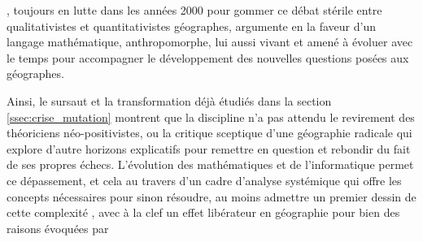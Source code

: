 
\textcite{Sheppard2001}, toujours en lutte dans les années 2000 pour gommer ce débat stérile entre qualitativistes et quantitativistes géographes, argumente en la faveur d'un langage mathématique, anthropomorphe, lui aussi vivant et amené à évoluer avec le temps pour accompagner le développement des nouvelles questions posées aux géographes.


Ainsi, le sursaut et la transformation déjà étudiés dans la section \ref{ssec:crise_mutation} montrent que la discipline n'a pas attendu le revirement des théoriciens néo-positivistes, ou la critique sceptique d'une géographie radicale qui explore d'autre horizons explicatifs pour remettre en question et rebondir du fait de ses propres échecs. L'évolution des mathématiques et de l'informatique permet ce dépassement, et cela au travers d'un cadre d'analyse systémique qui offre les concepts nécessaires pour sinon résoudre, au moins admettre un premier dessin de cette complexité \autocite{Dauphine2003}, avec à la clef un effet libérateur en géographie pour bien des raisons évoquées par \textcite[137]{Pumain2002} \textcite[27-28]{Pumain2003}



